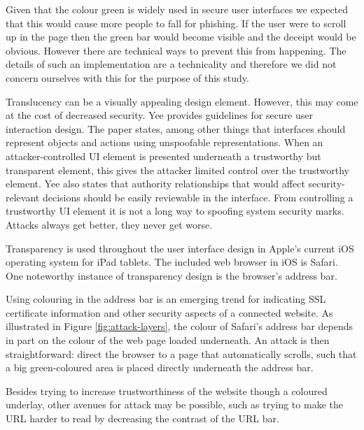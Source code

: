 \documentclass[twoside,letterpaper]{soups}
\begin{document}

Given that the colour green is widely used in secure user interfaces we expected that this would cause more people to fall for phishing. If the user were to scroll up in the page then the green bar would become visible and the deceipt would be obvious. However there are technical ways to prevent this from happening. The details of such an implementation are a technicality and therefore we did not concern ourselves with this for the purpose of this study.


Translucency can be a visually appealing design element. However, this may come at the cost of decreased security. Yee \cite{yee2005guidelines} provides guidelines for secure user interaction design. The paper states, among other things that interfaces should represent objects and actions using unspoofable representations. When an attacker-controlled UI element is presented underneath a trustworthy but transparent element, this gives the attacker limited control over the trustworthy element. Yee also states that authority relationships that would affect security-relevant decisions should be easily reviewable in the interface. From controlling a trustworthy UI element it is not a long way to spoofing system security marks. Attacks always get better, they never get worse.

Transparency is used throughout the user interface design in Apple's current iOS operating system for iPad tablets. The included web browser in iOS is Safari. One noteworthy instance of transparency design is the browser's address bar.

Using colouring in the address bar is an emerging trend for indicating SSL certificate information and other security aspects of a connected website. As illustrated in Figure \ref{fig:attack-layers}, the colour of Safari's address bar depends in part on the colour of the web page loaded underneath. An attack is then straightforward: direct the browser to a page that automatically scrolls, such that a big green-coloured area is placed directly underneath the address bar.

Besides trying to increase trustworthiness of the website though a coloured underlay, other avenues for attack may be possible, such as trying to make the URL harder to read by decreasing the contrast of the URL bar.
\end{document}
